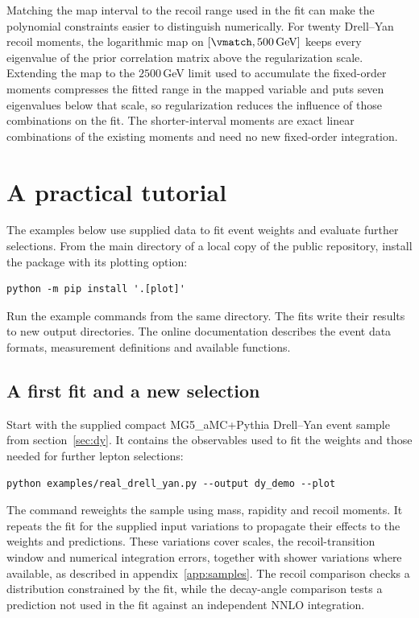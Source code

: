 Matching the map interval to the recoil range used in the fit can make the polynomial constraints easier to distinguish numerically. For twenty Drell--Yan recoil moments, the logarithmic map on $[\vmatch,500\,\mathrm{GeV}]$ keeps every eigenvalue of the prior correlation matrix above the regularization scale. Extending the map to the $2500\,$GeV limit used to accumulate the fixed-order moments compresses the fitted range in the mapped variable and puts seven eigenvalues below that scale, so regularization reduces the influence of those combinations on the fit. The shorter-interval moments are exact linear combinations of the existing moments and need no new fixed-order integration.

\FloatBarrier


\section{A practical tutorial}
\label{app:tutorial}

The examples below use supplied data to fit event weights and evaluate further selections. From the main directory of a local copy of the public repository, install the package with its plotting option:
\nopagebreak[4]
\begin{verbatim}
python -m pip install '.[plot]'
\end{verbatim}
Run the example commands from the same directory. The fits write their results to new output directories. The online documentation describes the event data formats, measurement definitions and available functions.

\subsection{A first fit and a new selection}

Start with the supplied compact MG5\_aMC+Pythia Drell--Yan event sample from section~\ref{sec:dy}. It contains the observables used to fit the weights and those needed for further lepton selections:
\begin{verbatim}
python examples/real_drell_yan.py --output dy_demo --plot
\end{verbatim}
The command reweights the sample using mass, rapidity and recoil moments. It repeats the fit for the supplied input variations to propagate their effects to the weights and predictions. These variations cover scales, the recoil-transition window and numerical integration errors, together with shower variations where available, as described in appendix~\ref{app:samples}. The recoil comparison checks a distribution constrained by the fit, while the decay-angle comparison tests a prediction not used in the fit against an independent NNLO integration.

